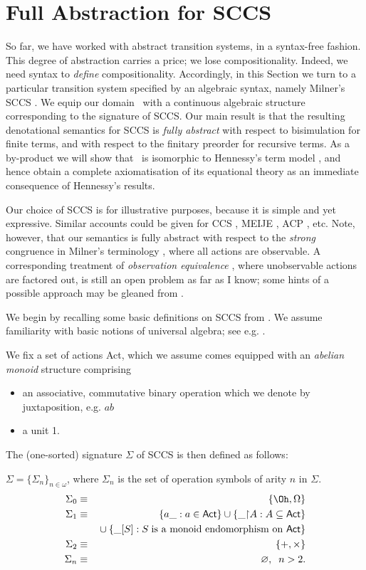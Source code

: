 \section{Full Abstraction for SCCS}
So far, we have worked with abstract transition systems, in a syntax-free fashion.
This degree of abstraction carries a price; we lose compositionality.
Indeed, we need syntax to {\em define} compositionality.
Accordingly, in this Section we turn to a particular transition system specified by an algebraic syntax, namely Milner's SCCS \cite{Mil83}.
We equip our domain \Dom\ with a continuous algebraic structure corresponding to the signature of SCCS.
Our main result is that the resulting denotational semantics for SCCS is {\em fully abstract} \cite{Mil75,Plo77} with respect to bisimulation for finite terms, and with respect to the finitary preorder for recursive terms.
As a by-product we will show that \Dom\ is isomorphic to Hennessy's term model \cite{Hen81}, and hence obtain a complete axiomatisation of its equational theory as an immediate consequence of Hennessy's results.

Our choice of SCCS is for illustrative purposes, because it is simple and yet expressive.
Similar accounts could be given for CCS \cite{Mil80}, MEIJE \cite{AB84}, ACP \cite{BK84}, etc.
Note, however, that our semantics is fully abstract with respect to the {\em strong} congruence in Milner's terminology \cite{Mil83}, where all actions are observable.
A corresponding treatment of {\em observation equivalence} \cite{HM85}, where unobservable actions are factored out, is still an open problem as far as I know; some hints of a possible approach may be gleaned from \cite{Abr87b}.

We begin by recalling some basic definitions on SCCS from \cite{Mil83,Hen81}.
We assume familiarity with basic notions of universal algebra; see e.g. \cite{ADJ78,EM85}.

We fix a set of actions {\sf Act}, which we assume comes equipped with an {\em abelian monoid} structure comprising
\begin{itemize}
\item an associative, commutative binary operation which we denote by juxtaposition, e.g. $ab$
\item a unit 1.
\end{itemize}
The (one-sorted) signature $\Sigma$ of SCCS is then defined as follows:

\begin{definition} 
{\rm $\Sigma = \{ \Sigma_{n} \}_{n \in \omega}$, where $\Sigma_{n}$ is the set of operation symbols of arity $n$ in $\Sigma$.
\begin{eqnarray*}
\Sigma_{0} & \equiv & \{ \Oh , \Omega \} \\
\Sigma_{1} & \equiv & \{ a\_ : a \in {\sf Act} \} \cup \{ \_{\restriction} A : A \subseteq {\sf Act} \} \\
& & \mbox{} \cup \{ \_ [S] : S \; \mbox{is a monoid endomorphism on {\sf Act}} \}  \\
\Sigma_{2} & \equiv & \{ {+}, {\times} \} \\
\Sigma_{n} & \equiv & \varnothing , \;\; n > 2 .
\end{eqnarray*} }
\end{definition}

